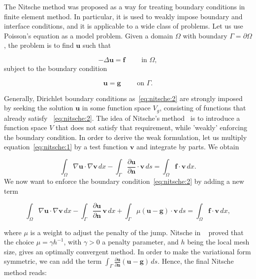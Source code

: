 \documentclass[11pt,a4paper,titlepage]{report}
\begin{document}
The Nitsche method was proposed as a way for treating boundary conditions in finite element method. In particular, it is used to weakly impose boundary and interface conditions, and it is applicable to a wide class of problems. Let us use Poisson's equation as a model problem. Given a domain $\Omega$ with boundary $\Gamma = \partial \Omega$, the problem is to find $\mathbf{u}$ such that

\begin{equation}
- \Delta \mathbf{u} = \mathbf{f} \qquad \text{ in } \Omega,
\label{eq:nitsche:1}
\end{equation}
subject to the boundary condition

\begin{equation}
\mathbf{u} = \mathbf{g} \qquad \text{ on } \Gamma.
\label{eq:nitsche:2}
\end{equation}

Generally, Dirichlet boundary conditions as~\eqref{eq:nitsche:2} are strongly imposed by seeking the solution $\mathbf{u}$ in some function space $V_g$, consisting of functions that already satisfy ~\eqref{eq:nitsche:2}. The idea of Nitsche's method~\cite{Nitsche1977} is to introduce a function space $V$ that does not satisfy that requirement, while 'weakly' enforcing the boundary condition. In order to derive the weak formulation, let us multiply equation~\eqref{eq:nitsche:1} by a test function $\mathbf{v}$ and integrate by parts. We obtain 

\begin{equation}
\label{eq:nitsche:3}
\int_{\Omega} \nabla \mathbf{u} \cdot \nabla \mathbf{v} \, dx
- \int_{\Gamma} \frac{\partial \mathbf{u}}{\partial \mathbf{n}} \cdot \mathbf{v} \, ds
= \int_{\Omega} \mathbf{f} \cdot \mathbf{v} \, dx. 
\end{equation}
We now want to enforce the boundary condition~\eqref{eq:nitsche:2} by adding a new term 

\begin{equation}
\int_{\Omega} \nabla \mathbf{u} \cdot \nabla \mathbf{v} \, dx
- \int_{\Gamma} \frac{\partial \mathbf{u}}{\partial \mathbf{n}} \, \mathbf{v} \, dx 
+ \int_{\Gamma} \mu (\mathbf{u} - \mathbf{g}) \cdot \mathbf{v} \, ds
= \int_{\Omega} \mathbf{f} \cdot \mathbf{v} \, dx,
\end{equation}

where $\mu$ is a  weight to adjust the penalty of the jump. Nitsche in ~\cite{Nitsche1977} proved that the choice $\mu = \gamma h^{-1}$, with $\gamma > 0$ a penalty parameter, and $h$ being the local mesh size, gives an optimally convergent method. In order to make the variational form symmetric, we can add the term $\int_{\Gamma} \frac{\partial \mathbf{u}}{\partial \mathbf{n}}(\mathbf{u}-\mathbf{g}) \, ds$. Hence, the final Nitsche method reads:
\end{document}
